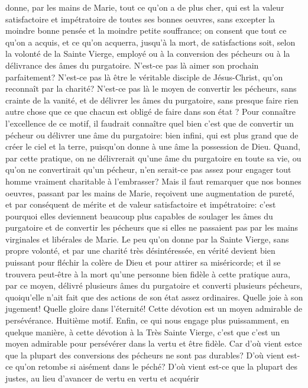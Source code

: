 donne, par les mains de Marie, tout ce qu'on a de plus cher, qui est la valeur satisfactoire et impétratoire de toutes
ses bonnes oeuvres, sans excepter la moindre bonne pensée et la moindre petite souffrance; on consent que tout
ce qu'on a acquis, et ce qu'on acquerra, jusqu'à la mort, de satisfactions soit, selon la volonté de la Sainte Vierge,
employé ou à la conversion des pécheurs ou à la délivrance des âmes du purgatoire.
N'est-ce pas là aimer son prochain parfaitement? N'est-ce pas là être le véritable disciple de Jésus-Christ, qu'on
reconnaît par la charité? N'est-ce pas là le moyen de convertir les pécheurs, sans crainte de la vanité, et de
délivrer les âmes du purgatoire, sans presque faire rien autre chose que ce que chacun est obligé de faire dans
son état ?
 Pour connaître l'excellence de ce motif, il faudrait connaître quel bien c'est que de convertir un pécheur ou
délivrer une âme du purgatoire: bien infini, qui est plus grand que de créer le ciel et la terre, puisqu'on donne à une
âme la possession de Dieu. Quand, par cette pratique, on ne délivrerait qu'une âme du purgatoire en toute sa vie,
ou qu'on ne convertirait qu'un pécheur, n'en serait-ce pas assez pour engager tout homme vraiment charitable à
l'embrasser? Mais il faut remarquer que nos bonnes oeuvres, passant par les mains de Marie, reçoivent une
augmentation de pureté, et par conséquent de mérite et de valeur satisfactoire et impétratoire: c'est pourquoi elles
deviennent beaucoup plus capables de soulager les âmes du purgatoire et de convertir les pécheurs que si elles
ne passaient pas par les mains virginales et libérales de Marie. Le peu qu'on donne par la Sainte Vierge, sans
propre volonté, et par une charité très désintéressée, en vérité devient bien puissant pour fléchir la colère de Dieu
et pour attirer sa miséricorde; et il se trouvera peut-être à la mort qu'une personne bien fidèle à cette pratique aura,
par ce moyen, délivré plusieurs âmes du purgatoire et converti plusieurs pécheurs, quoiqu'elle n'ait fait que des
actions de son état assez ordinaires. Quelle joie à son jugement! Quelle gloire dans l'éternité!
Cette dévotion est un moyen admirable de persévérance.
 Huitième motif. Enfin, ce qui nous engage plus puissamment, en quelque manière, à cette dévotion à la Très
Sainte Vierge, c'est que c'est un moyen admirable pour persévérer dans la vertu et être fidèle. Car d'où vient estce que la plupart des conversions des pécheurs ne sont pas durables? D'où vient est-ce qu'on retombe si
aisément dans le péché? D'où vient est-ce que la plupart des justes, au lieu d'avancer de vertu en vertu et acquérir
